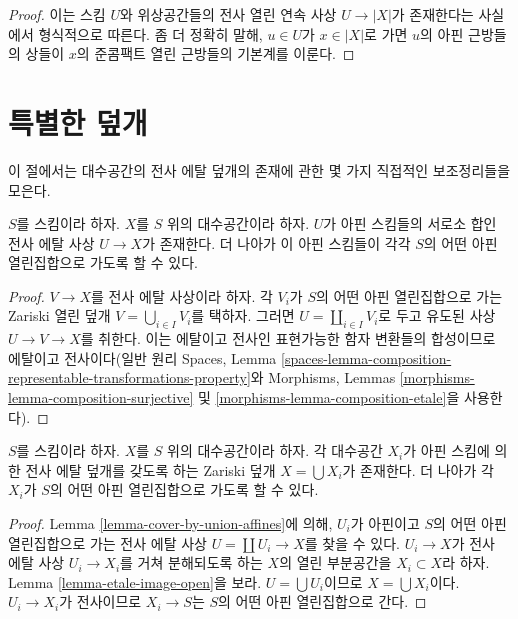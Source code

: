 \begin{proof}
이는 스킴 $U$와 위상공간들의 전사 열린 연속 사상
$U \to |X|$가 존재한다는 사실에서 형식적으로 따른다. 좀 더 정확히 말해,
$u \in U$가 $x \in |X|$로 가면 $u$의 아핀 근방들의 상들이
$x$의 준콤팩트 열린 근방들의 기본계를 이룬다.
\end{proof}







\section{특별한 덮개}
\label{section-special-coverings}

\noindent
이 절에서는 대수공간의 전사 에탈 덮개의 존재에 관한 몇 가지
직접적인 보조정리들을 모은다.

\begin{lemma}
\label{lemma-cover-by-union-affines}
$S$를 스킴이라 하자.
$X$를 $S$ 위의 대수공간이라 하자.
$U$가 아핀 스킴들의 서로소 합인 전사 에탈 사상 $U \to X$가 존재한다.
더 나아가 이 아핀 스킴들이 각각 $S$의 어떤 아핀 열린집합으로
가도록 할 수 있다.
\end{lemma}

\begin{proof}
$V \to X$를 전사 에탈 사상이라 하자.
각 $V_i$가 $S$의 어떤 아핀 열린집합으로 가는 Zariski 열린 덮개
$V = \bigcup_{i \in I} V_i$를 택하자.
그러면 $U = \coprod_{i \in I} V_i$로 두고 유도된 사상
$U \to V \to X$를 취한다. 이는 에탈이고 전사인 표현가능한 함자 변환들의
합성이므로 에탈이고 전사이다(일반 원리 Spaces, Lemma
\ref{spaces-lemma-composition-representable-transformations-property}와
Morphisms, Lemmas \ref{morphisms-lemma-composition-surjective} 및
\ref{morphisms-lemma-composition-etale}을 사용한다).
\end{proof}

\begin{lemma}
\label{lemma-union-of-quasi-compact}
$S$를 스킴이라 하자.
$X$를 $S$ 위의 대수공간이라 하자.
각 대수공간 $X_i$가 아핀 스킴에 의한 전사 에탈 덮개를 갖도록 하는
Zariski 덮개 $X = \bigcup X_i$가 존재한다. 더 나아가 각 $X_i$가
$S$의 어떤 아핀 열린집합으로 가도록 할 수 있다.
\end{lemma}

\begin{proof}
Lemma \ref{lemma-cover-by-union-affines}에 의해, $U_i$가 아핀이고
$S$의 어떤 아핀 열린집합으로 가는 전사 에탈 사상
$U = \coprod U_i \to X$를 찾을 수 있다. $U_i \to X$가 전사 에탈 사상
$U_i \to X_i$를 거쳐 분해되도록 하는 $X$의 열린 부분공간을
$X_i \subset X$라 하자. Lemma \ref{lemma-etale-image-open}을 보라.
$U = \bigcup U_i$이므로 $X = \bigcup X_i$이다.
$U_i \to X_i$가 전사이므로 $X_i \to S$는 $S$의 어떤 아핀 열린집합으로 간다.
\end{proof}

